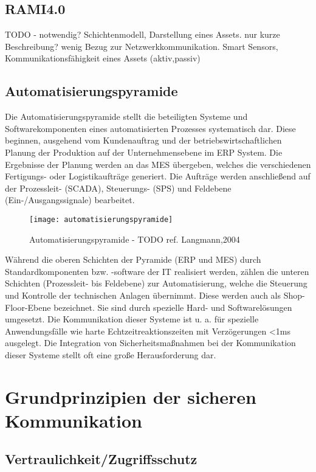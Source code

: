\subsection{\ac{RAMI4.0}}
TODO - notwendig? Schichtenmodell, Darstellung eines Assets. nur kurze Beschreibung? wenig Bezug zur Netzwerkkommunikation. Smart Sensors, Kommunikationsfähigkeit eines Assets (aktiv,passiv)

\subsection{Automatisierungspyramide}
Die Automatisierungspyramide stellt die beteiligten Systeme und Softwarekomponenten eines automatisierten Prozesses systematisch dar. Diese beginnen, ausgehend vom Kundenauftrag und der betriebswirtschaftlichen Planung der Produktion auf der Unternehmensebene im \ac{ERP} System. Die Ergebnisse der Planung werden an das \ac{MES} übergeben, welches die verschiedenen Fertigungs- oder Logistikaufträge generiert. Die Aufträge werden anschließend auf der Prozessleit- (\ac{SCADA}), Steuerungs- (\ac{SPS}) und Feldebene (Ein-/Ausgangssignale) bearbeitet.

\begin{figure}[h]
  \centering
  \texttt{[image: automatisierungspyramide]}
  \caption{Automatisierungspyramide - TODO ref. Langmann,2004}
  \label{Kap2:Automatisierungspyramide}
\end{figure}

\clearpage

Während die oberen Schichten der Pyramide (\ac{ERP} und \ac{MES}) durch Standardkomponenten bzw. -software der IT realisiert werden, zählen die unteren Schichten (Prozessleit- bis Feldebene) zur Automatisierung, welche die Steuerung und Kontrolle der technischen Anlagen übernimmt. Diese werden auch als Shop-Floor-Ebene bezeichnet. Sie sind durch spezielle Hard- und Softwarelösungen umgesetzt. Die Kommunikation dieser Systeme ist u. a. für spezielle Anwendungsfälle wie harte Echtzeitreaktionszeiten mit Verzögerungen <1ms ausgelegt. Die Integration von Sicherheitsmaßnahmen bei der Kommunikation dieser Systeme stellt oft eine große Herausforderung dar.

\section{Grundprinzipien der sicheren Kommunikation}
\subsection{Vertraulichkeit/Zugriffsschutz}
